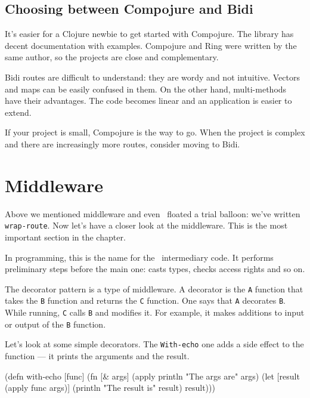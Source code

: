 \subsection{Choosing between Compojure and Bidi}

It's easier for a Clojure newbie to get started with Compojure. The library has decent documentation with examples. Compojure and Ring were written by the same author, so the projects are close and complementary.

Bidi routes are difficult to understand: they are wordy and not intuitive. Vectors and maps can be easily confused in them. On the other hand, multi-methods have their advantages. The code becomes linear and an application is easier to extend.

If your project is small, Compojure is the way to go. When the project is complex and there are increasingly more routes, consider moving to Bidi.

\section{Middleware}


Above we mentioned middleware and even  floated a trial balloon: we've written \verb|wrap-route|. Now let's have a closer look at the middleware. This is the most important section in the chapter.

In programming, this is the name for the  intermediary code. It performs preliminary steps before the main one: casts types, checks access rights and so on.

\label{decorator}


The decorator pattern is a type of middleware. A decorator is the \verb|A| function that takes the \verb|B| function and returns the \verb|C| function. One says that \verb|A| decorates \verb|B|. While running, \verb|C| calls \verb|B| and modifies it. For example, it makes additions to input or output of the \verb|B| function.

Let's look at some simple decorators. The \verb|With-echo| one adds a side effect to the function — it prints the arguments and the result.

\begin{english}
\begin{clojure}
(defn with-echo [func]
(fn [& args]
(apply println "The args are" args)
(let [result (apply func args)]
(println "The result is" result)
result)))
\end{clojure}
\end{english}

